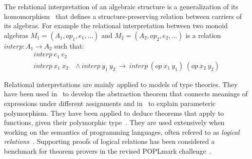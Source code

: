 The relational interpretation of an algebraic structure is a generalization of its homomorphism~\cite{reynolds1983types} that defines a 
structure-preserving relation between carriers of its algebras. For example the relational interpretation between two monoid algebras $M_1 = (A_1,op_1,e_1,...)$ and $M_2 = (A_2,op_2,e_2,...)$ is a relation $interp : A_1 \to A_2$ such that: 
\begin{align*}
interp\ e_1\ e_2 &  \\
interp\ x_1\ x_2\ &\wedge\ interp\ y_1\ y_2\ \rightarrow\ interp\ (op\ x_1\ y_1)\ (op\ x_2\ y_2)  
\end{align*}


Relational interpretations are mainly applied to models of type theories. They have been used in~\cite{reynolds1983types} to develop the abstraction theorem that connects meanings of expressions under different assignments and in~\cite{parametricPoly93} to explain parameteric polymorphism. They have been applied to deduce theorems that apply to functions, given their polymorphic type~\cite{wadler1989theorems, algehed2020dynamic}. 
They are used extensively when working on the semantics of programming languages, often refered to as \emph{logical relations}~\cite{crary2005logical}. Supporting proofs of logical relations has been considered a benchmark for theorem provers in the revised POPLmark challenge~\cite{poplmark2019}.  





